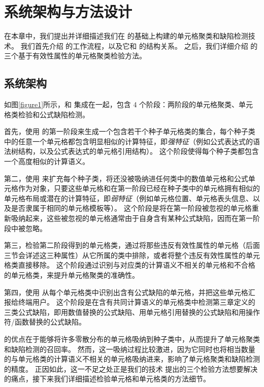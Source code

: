 \chapter{系统架构与方法设计}
在本章中，我们提出并详细描述我们在 \cu 的基础上构建的单元格聚类和缺陷检测技术\wa 。
我们首先介绍 \wa 的工作流程，以及它和 \cu 的结构关系。
之后，我们详细介绍 \wa 的三个基于有效性属性的单元格聚类检验方法。


\section{系统架构}
如图\ref{figure1}所示，\wa 和 \cu 集成在一起，包含 4 个阶段：两阶段的单元格聚类、单元格类检验和公式缺陷检测。

首先，\wa 使用 \cu 的第一阶段来生成一个包含若干个种子单元格类的集合，每个种子类中的任意一个单元格都包含明显相似的计算特征，即\textit{强特征}（例如公式表达式的语法树结构，以及公式表达式的单元格引用结构）。
这个阶段使得每个种子类都包含一个高度相似的计算语义。

第二，\wa 使用 \cu 来扩充每个种子类，将还没被吸纳进任何类中的数值单元格和公式单元格作为对象，只要这些单元格和在第一阶段已经在种子类中的单元格拥有相似的单元格布局或潜在的计算特征，即\textit{弱特征}（例如单元格位置、单元格表头信息、以及是否隶属于相同的单元格模板等）。
这个阶段是将在第一阶段被忽视的单元格重新吸纳起来，这些被忽视的单元格通常由于自身含有某种公式缺陷，因而在第一阶段中被忽略。

第三，\wa 检验第二阶段得到的单元格类，通过将那些违反有效性属性的单元格（后面三节会详述这三种属性）从它所属的类中排除，或者将整个违反有效性属性的单元格类直接移除。
这个阶段通过识别与对应类的计算语义不相关的单元格和不合格的单元格类，来提升单元格聚类的准确性。

第四，\wa 使用 \cu 从每个单元格类中识别出含有公式缺陷的单元格，并把这些单元格汇报给终端用户。
这个阶段是在含有共同计算语义的单元格类中检测第三章定义的三类公式缺陷，即用数值替换的公式缺陷、用单元格引用替换的公式缺陷和用操作符/函数替换的公式缺陷。

\cu 的优点在于能够将许多零散分布的单元格吸纳到种子类中，从而提升了单元格聚类和缺陷检测的召回率\cite{cheung2016custodes}。
然而，这一吸纳过程比较激进，因为它同时也将相当数量的与单元格类的计算语义不相关的单元格吸纳进来，影响了单元格聚类和缺陷检测的精度。
正因如此，这一不足之处正是我们的技术 \wa 提出的三个检验方法想要解决的痛点，接下来我们详细描述检验单元格和单元格类的方法细节。



